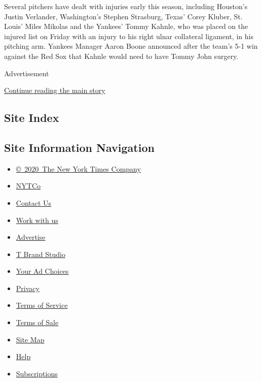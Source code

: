 Several pitchers have dealt with injuries early this season, including
Houston's Justin Verlander, Washington's Stephen Strasburg, Texas' Corey
Kluber, St. Louis' Miles Mikolas and the Yankees' Tommy Kahnle, who was
placed on the injured list on Friday with an injury to his right ulnar
collateral ligament, in his pitching arm. Yankees Manager Aaron Boone
announced after the team's 5-1 win against the Red Sox that Kahnle would
need to have Tommy John surgery.

Advertisement

\protect\hyperlink{after-bottom}{Continue reading the main story}

\hypertarget{site-index}{%
\subsection{Site Index}\label{site-index}}

\hypertarget{site-information-navigation}{%
\subsection{Site Information
Navigation}\label{site-information-navigation}}

\begin{itemize}
\tightlist
\item
  \href{https://help.nytimes.com/hc/en-us/articles/115014792127-Copyright-notice}{©~2020~The
  New York Times Company}
\end{itemize}

\begin{itemize}
\tightlist
\item
  \href{https://www.nytco.com/}{NYTCo}
\item
  \href{https://help.nytimes.com/hc/en-us/articles/115015385887-Contact-Us}{Contact
  Us}
\item
  \href{https://www.nytco.com/careers/}{Work with us}
\item
  \href{https://nytmediakit.com/}{Advertise}
\item
  \href{http://www.tbrandstudio.com/}{T Brand Studio}
\item
  \href{https://www.nytimes.com/privacy/cookie-policy\#how-do-i-manage-trackers}{Your
  Ad Choices}
\item
  \href{https://www.nytimes.com/privacy}{Privacy}
\item
  \href{https://help.nytimes.com/hc/en-us/articles/115014893428-Terms-of-service}{Terms
  of Service}
\item
  \href{https://help.nytimes.com/hc/en-us/articles/115014893968-Terms-of-sale}{Terms
  of Sale}
\item
  \href{https://spiderbites.nytimes.com}{Site Map}
\item
  \href{https://help.nytimes.com/hc/en-us}{Help}
\item
  \href{https://www.nytimes.com/subscription?campaignId=37WXW}{Subscriptions}
\end{itemize}
